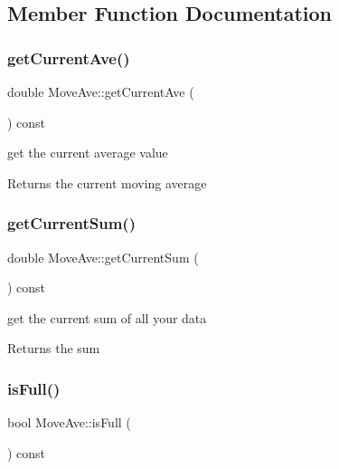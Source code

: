 \subsection{Member Function Documentation}
\mbox{\label{classMoveAve_a5a48674a3d3a2d92baf896d8321cd909}} 
\subsubsection{\texorpdfstring{get\+Current\+Ave()}{getCurrentAve()}}
{\footnotesize\ttfamily double Move\+Ave\+::get\+Current\+Ave (\begin{DoxyParamCaption}{ }\end{DoxyParamCaption}) const}



get the current average value 

\begin{DoxyReturn}{Returns}
the current moving average 
\end{DoxyReturn}
\mbox{\label{classMoveAve_a8976714955c304bea3149c51e0c8cd95}} 
\subsubsection{\texorpdfstring{get\+Current\+Sum()}{getCurrentSum()}}
{\footnotesize\ttfamily double Move\+Ave\+::get\+Current\+Sum (\begin{DoxyParamCaption}{ }\end{DoxyParamCaption}) const}



get the current sum of all your data 

\begin{DoxyReturn}{Returns}
the sum 
\end{DoxyReturn}
\mbox{\label{classMoveAve_a2511f0602d9bffdb8ddc8cd31d81ef66}} 
\subsubsection{\texorpdfstring{is\+Full()}{isFull()}}
{\footnotesize\ttfamily bool Move\+Ave\+::is\+Full (\begin{DoxyParamCaption}{ }\end{DoxyParamCaption}) const}

